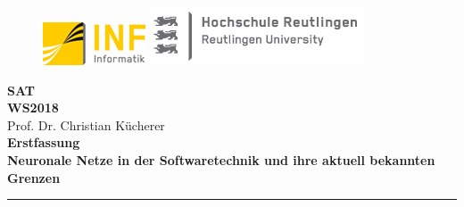 \begin{titlepage}

\begin{center}

\begin{figure}
\begin{minipage}[H]{4cm}
\centering
\includegraphics[width=0.8\linewidth]{Bilder/Deckblatt/UniversityLogo.png}
\end{minipage}
\hfill
\begin{minipage}[H]{6cm}
\centering
\includegraphics[width=1\linewidth]{Bilder/Deckblatt/CompanyLogo.jpg}
\end{minipage}
\end{figure}

\vspace*{0.8cm}

\textbf{SAT} \\
\vspace*{0.2cm}
{\large \textbf{WS2018\\}}
\vspace*{0.4cm}
Prof. Dr. Christian Kücherer\\
\vspace*{0.8cm}
{\large \textbf{Erstfassung}}
\vspace*{0.2cm}\\
\textbf{{\large {\Large Neuronale Netze in der Softwaretechnik und ihre aktuell bekannten Grenzen }}}\\

\noindent\rule{\textwidth}{2pt}
\vspace*{0.6cm}


\end{center}
\end{titlepage}
